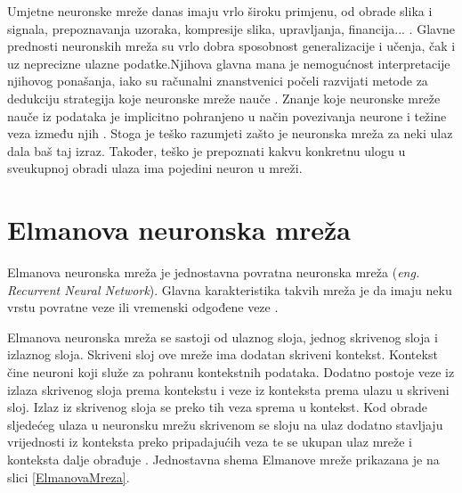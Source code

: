 \documentclass[zavrsnirad]{fer}
\begin{document}
	Umjetne neuronske mreže danas imaju vrlo široku primjenu, od obrade slika i signala, prepoznavanja uzoraka, kompresije slika, upravljanja, financija... \cite{skriptaNeuronskeMreze}. Glavne prednosti neuronskih mreža su vrlo dobra sposobnost generalizacije i učenja, čak i uz neprecizne ulazne podatke.Njihova glavna mana je nemogućnost interpretacije njihovog ponašanja, iako su računalni znanstvenici počeli razvijati metode za dedukciju strategija koje neuronske mreže nauče \cite{MITNeuralNet}. Znanje koje neuronske mreže nauče iz podataka je implicitno pohranjeno u način povezivanja neurone i težine veza između njih \cite{skriptaNeuronskeMreze}. Stoga je teško razumjeti zašto je neuronska mreža za neki ulaz dala baš taj izraz. Također, teško je prepoznati kakvu konkretnu ulogu u sveukupnoj obradi ulaza ima pojedini neuron u mreži.
	
	\section{Elmanova neuronska mreža}
	\label{pog:ElmanovaMreza}
	
		Elmanova neuronska mreža je jednostavna povratna neuronska mreža (\textit{eng. Recurrent Neural Network}). Glavna karakteristika takvih mreža je da imaju neku vrstu povratne veze ili vremenski odgođene veze \cite{ElmanNetSite}.
		
		Elmanova neuronska mreža se sastoji od ulaznog sloja, jednog skrivenog sloja i izlaznog sloja. Skriveni sloj ove mreže ima dodatan skriveni kontekst. Kontekst čine neuroni koji služe za pohranu kontekstnih podataka. Dodatno postoje veze iz izlaza skrivenog sloja prema kontekstu i veze iz konteksta prema ulazu u skriveni sloj. Izlaz iz skrivenog sloja se preko tih veza sprema u kontekst. Kod obrade sljedećeg ulaza u neuronsku mrežu skrivenom se sloju na ulaz dodatno stavljaju vrijednosti iz konteksta preko pripadajućih veza te se ukupan ulaz mreže i konteksta dalje obrađuje \cite{Elman}. Jednostavna shema Elmanove mreže prikazana je na slici \ref{ElmanovaMreza}.
		
\end{document}
